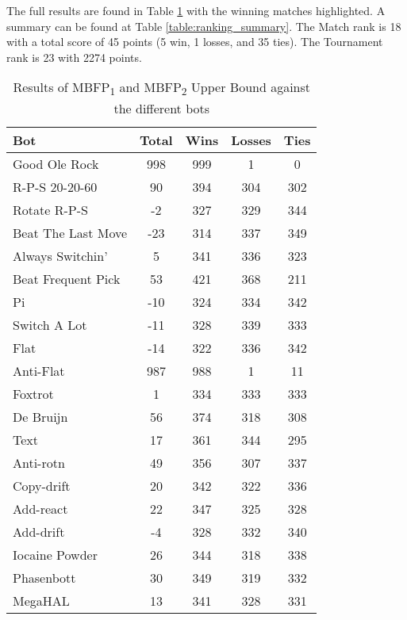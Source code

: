 The full results are found in Table \ref{table:JustMBFP2_UpperBound_results} with the winning matches highlighted. A summary can be found at Table \ref{table:ranking_summary}. The Match rank is 18 with a total score of 45 points (5 win, 1 losses, and 35 ties). The Tournament rank is 23 with 2274 points.

\begin{table}
    \caption{Results of MBFP\textsubscript{1} and MBFP\textsubscript{2} Upper Bound against the different bots}
    \label{table:JustMBFP2_UpperBound_results}
    \centering
    \begin{tabular}{|l|c|c|c|c|}
        \hline
        \textbf{Bot} & \textbf{Total} & \textbf{Wins} & \textbf{Losses} & \textbf{Ties} \\ \hline
\rowcolor{HighlightRowColor} Good Ole Rock & 998 & 999 & 1 & 0 \\ \hline 
\rowcolor{HighlightRowColor} R-P-S 20-20-60 & 90 & 394 & 304 & 302 \\ \hline 
Rotate R-P-S & -2 & 327 & 329 & 344 \\ \hline 
Beat The Last Move & -23 & 314 & 337 & 349 \\ \hline 
Always Switchin' & 5 & 341 & 336 & 323 \\ \hline 
\rowcolor{HighlightRowColor} Beat Frequent Pick & 53 & 421 & 368 & 211 \\ \hline 
Pi & -10 & 324 & 334 & 342 \\ \hline 
Switch A Lot & -11 & 328 & 339 & 333 \\ \hline 
Flat & -14 & 322 & 336 & 342 \\ \hline 
\rowcolor{HighlightRowColor} Anti-Flat & 987 & 988 & 1 & 11 \\ \hline 
Foxtrot & 1 & 334 & 333 & 333 \\ \hline 
\rowcolor{HighlightRowColor} De Bruijn & 56 & 374 & 318 & 308 \\ \hline 
Text & 17 & 361 & 344 & 295 \\ \hline 
Anti-rotn & 49 & 356 & 307 & 337 \\ \hline 
Copy-drift & 20 & 342 & 322 & 336 \\ \hline 
Add-react & 22 & 347 & 325 & 328 \\ \hline 
Add-drift & -4 & 328 & 332 & 340 \\ \hline 
Iocaine Powder & 26 & 344 & 318 & 338 \\ \hline 
Phasenbott & 30 & 349 & 319 & 332 \\ \hline 
MegaHAL & 13 & 341 & 328 & 331 \\ \hline 

\end{tabular}
\end{table}

